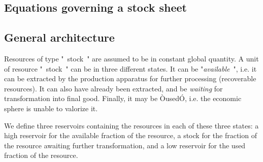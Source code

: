\documentclass[12pt,a4paper]{article}%
\begin{document}
\begin{appendix}
\section{Equations governing a stock sheet}  
\subsection{General architecture} 
Resources of type "~stock~" are assumed to be in constant global quantity. A unit of resource "~stock~" can be in three different states.  It can be "\textit{available}~", i.e. it can be extracted by the production apparatus for further processing (recoverable resources). It can also have already been extracted, and be \textit{waiting} for transformation into final good. Finally, it may be ÒusedÓ, i.e. the economic sphere is unable to valorize it.  

We define three reservoirs containing the resources in each of these three states: a high reservoir for the available fraction of the resource, a stock for the fraction of the resource awaiting further transformation, and a low reservoir for the used fraction of the resource.  


\end{appendix}
\end{document}
